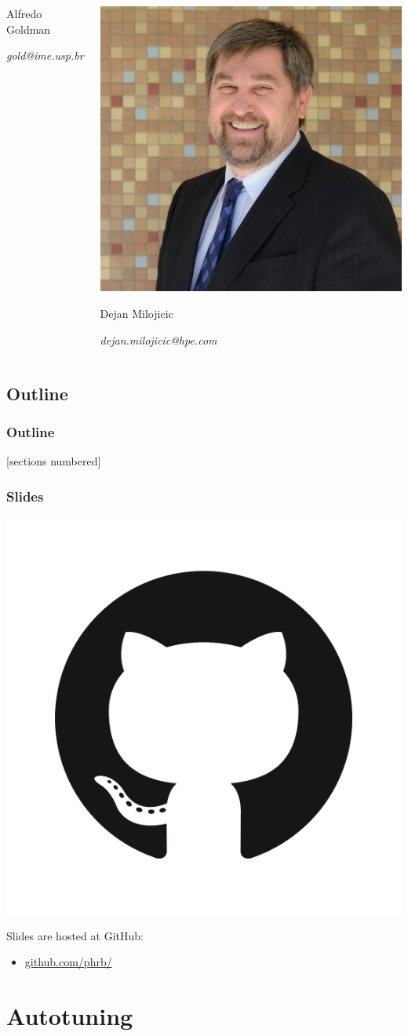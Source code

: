 \documentclass[10pt, compress, aspectratio=169]{beamer}
\begin{document}
\begin{frame}
\begin{columns}[T,onlytextwidth]
\begin{center}
            Alfredo Goldman

            \textit{gold@ime.usp.br}
        \end{center}

        \begin{center}
            \includegraphics[width=.32\textwidth]{dejan}

            Dejan Milojicic

            \textit{dejan.milojicic@hpe.com}
        \end{center}

    \end{columns}
\end{frame}

\subsection*{Outline}

\begin{frame}
    \frametitle{Outline}
    [sections numbered]
    \tableofcontents[hideallsubsections]
\end{frame}

\begin{frame}
    \frametitle{Slides}
    \begin{center}
        \includegraphics[width=.18\textwidth]{github}
    \end{center}
    Slides are hosted at \alert{GitHub}:

    \begin{itemize}
        \item \url{github.com/phrb/}
    \end{itemize}
\end{frame}

\section{Autotuning}
\end{document}
